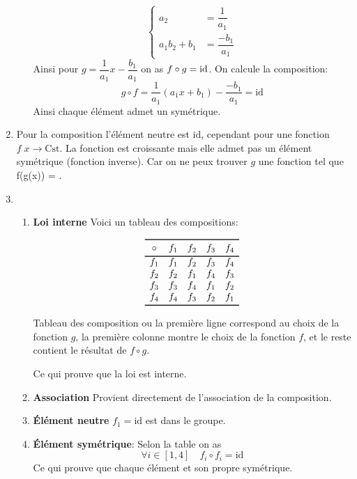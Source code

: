\documentclass{report}
\begin{document}
\begin{myproof}
\begin{enumerate}
\begin{enumerate}
        $$
        \begin{cases}
          a_2&= \dfrac{1}{a_1} \\[8pt]
          a_1b_2 + b_1 &= \dfrac{-b_1}{a_1}
        \end{cases}
        $$
        Ainsi pour $g = \dfrac{1}{a_1} x - \dfrac{b_1}{a_1}$ on as $f\circ g =
      \id$. On calcule la composition:
      $$
      g\circ f = \dfrac{1}{a_1}(a_1x + b_1) - \dfrac{-b_1}{a_1} = \text{id}
      $$
      Ainsi chaque élément admet un symétrique.
      \end{enumerate}
    \item 
      Pour la composition l'élément neutre est $\text{id}$, cependant pour une
      fonction $f\;x\longrightarrow \text{Cst}$. La fonction est croissante mais elle admet
      pas un élément symétrique (fonction inverse). Car on ne peux trouver $g$ une
      fonction tel que 
      f(g(x)) = .
    \item 
      \begin{enumerate}
        \item \textbf{Loi interne}
          Voici un tableau des compositions:
          \begin{table}[h]
         $$
         \begin{array}{ccccc}
            
           \toprule
           \circ & f_1 & f_2 & f_3 & f_4\\
           \bottomrule
           f_1 & f_1 & f_2 & f_3 & f_4  \\
           f_2 & f_2 &  f_1  &  f_4    & f_3    \\ 
           f_3 & f_3 &  f_4 & f_1 & f_2 \\
           f_4 & f_4 &  f_3 & f_2 & f_1\\
           \bottomrule
         \end{array}
         $$
         \caption{Tableau des composition ou la première ligne correspond au
         choix de la fonction $g$, la première colonne montre le choix de la
       fonction $f$, et le reste contient le résultat de $f\circ g$. }
       \end{table}
       Ce qui prouve que la loi est interne.
     \item \textbf{Association} Provient directement de l'association de la
       composition.
     \item \textbf{Élément neutre} $f_1 = \text{id}$ est dans le groupe.

     \item \textbf{Élément symétrique}: 
       Selon la table on as 
       $$
       \forall i\in [1,4]\quad f_i \circ f_i = \text{id}
       $$
       Ce qui prouve que chaque élément et son propre symétrique.
      \end{enumerate}
  \end{enumerate}
  
\end{myproof}
\end{document}
